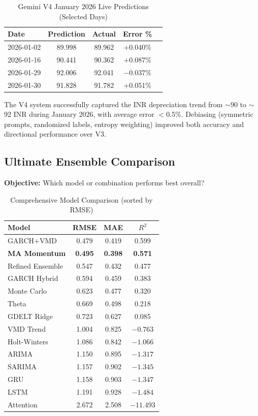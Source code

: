 \documentclass[11pt]{article}
\begin{document}
\begin{table}[H]
\centering
\small
\caption{Gemini V4 January 2026 Live Predictions (Selected Days)}
\label{tab:jan2026}
\begin{tabular}{lcccc}
\toprule
\textbf{Date} & \textbf{Prediction} & \textbf{Actual} & \textbf{Error \%} \\
\midrule
2026-01-02 & 89.998 & 89.962 & +0.040\% \\
2026-01-16 & 90.441 & 90.362 & +0.087\% \\
2026-01-29 & 92.006 & 92.041 & $-0.037$\% \\
2026-01-30 & 91.828 & 91.782 & +0.051\% \\
\bottomrule
\end{tabular}
\end{table}

The V4 system successfully captured the INR depreciation trend from $\sim$90 to $\sim$92 INR during January 2026, with average error $<$0.5\%. Debiasing (symmetric prompts, randomized labels, entropy weighting) improved both accuracy and directional performance over V3.

\subsection{Ultimate Ensemble Comparison}

\textbf{Objective:} Which model or combination performs best overall?

\begin{table}[H]
\centering
\small
\caption{Comprehensive Model Comparison (sorted by RMSE)}
\label{tab:ensemble}
\begin{tabular}{lccc}
\toprule
\textbf{Model} & \textbf{RMSE} & \textbf{MAE} & \textbf{$R^2$} \\
\midrule
GARCH+VMD & 0.479 & 0.419 & 0.599 \\
\textbf{MA Momentum} & \textbf{0.495} & \textbf{0.398} & \textbf{0.571} \\
Refined Ensemble & 0.547 & 0.432 & 0.477 \\
GARCH Hybrid & 0.594 & 0.459 & 0.383 \\
Monte Carlo & 0.623 & 0.477 & 0.320 \\
Theta & 0.669 & 0.498 & 0.218 \\
GDELT Ridge & 0.723 & 0.627 & 0.085 \\
VMD Trend & 1.004 & 0.825 & $-0.763$ \\
Holt-Winters & 1.086 & 0.842 & $-1.066$ \\
ARIMA & 1.150 & 0.895 & $-1.317$ \\
SARIMA & 1.157 & 0.902 & $-1.345$ \\
GRU & 1.158 & 0.903 & $-1.347$ \\
LSTM & 1.191 & 0.928 & $-1.484$ \\
Attention & 2.672 & 2.508 & $-11.493$ \\
\bottomrule
\end{tabular}
\end{table}
\end{document}

